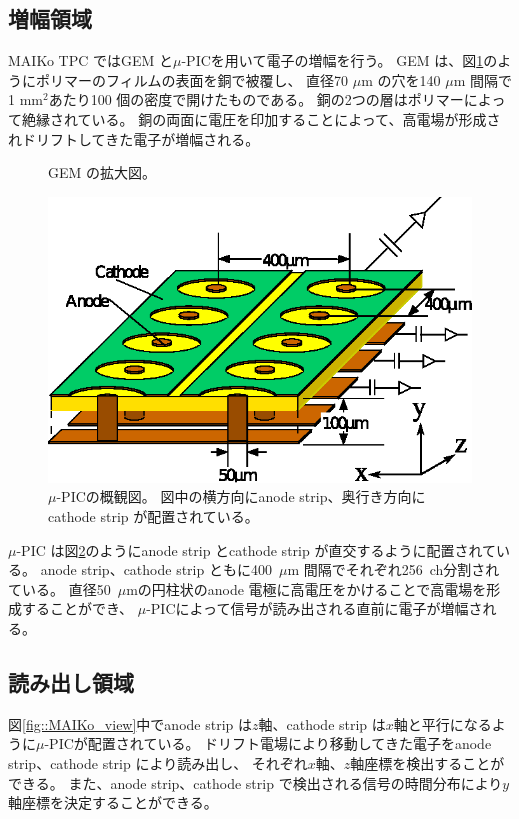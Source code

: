 \documentclass[../master]{subfiles}
\begin{document}
\subsection{増幅領域}
MAIKo TPC ではGEM と$\mu$-PICを用いて電子の増幅を行う。
GEM は、図\ref{pic::GEM}のようにポリマーのフィルムの表面を銅で被覆し、
直径70 $\mu$m の穴を140 $\mu$m 間隔で1 mm$^2$あたり100 個の密度で開けたものである。
銅の2つの層はポリマーによって絶縁されている。
銅の両面に電圧を印加することによって、高電場が形成されドリフトしてきた電子が増幅される。
\begin{figure}
  \centering
  \caption{GEM の拡大図。}
  \label{pic::GEM}  
\end{figure}
\begin{figure}
  \centering
  \includegraphics[clip, width=0.7\columnwidth]{upic_struc_xyz.eps}
  \caption[$\mu$-PICの概観図。]{$\mu$-PICの概観図。
    図中の横方向にanode strip、奥行き方向にcathode strip が配置されている。
  }
  \label{fig::mupic}
\end{figure}
$\mu$-PIC は図\ref{fig::mupic}のようにanode strip とcathode strip が直交するように配置されている。
anode strip、cathode strip ともに400~$\mu$m 間隔でそれぞれ256~ch分割されている。
直径50~$\mu$mの円柱状のanode 電極に高電圧をかけることで高電場を形成することができ、
$\mu$-PICによって信号が読み出される直前に電子が増幅される。

\subsection{読み出し領域}
\label{sec::mu-pic}
図\ref{fig::MAIKo_view}中でanode strip は$z$軸、cathode strip は$x$軸と平行になるように$\mu$-PICが配置されている。
ドリフト電場により移動してきた電子をanode strip、cathode strip により読み出し、
それぞれ$x$軸、$z$軸座標を検出することができる。
また、anode strip、cathode strip で検出される信号の時間分布により$y$軸座標を決定することができる。
\end{document}
